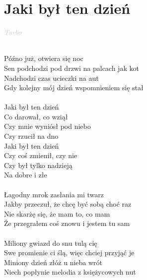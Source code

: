 \documentclass[a5paper, 10pt]{book}
\begin{document}
\section{Jaki był ten dzień}\textcolor{lightgray}{\textit{Turbo}}\\~\\
\begin{minipage}[t]{0.7\textwidth}
Późno już, otwiera się noc\\
Sen podchodzi pod drzwi na palcach jak kot\\
Nadchodzi czas ucieczki na aut\\
Gdy kolejny mój dzień wspomnieniem się stał\\
\\
\hspace*{5mm}Jaki był ten dzień\\
\hspace*{5mm}Co darował, co wziął\\
\hspace*{5mm}Czy mnie wyniósł pod niebo\\
\hspace*{5mm}Czy rzucił na dno\\
\hspace*{5mm}Jaki był ten dzień\\
\hspace*{5mm}Czy coś zmienił, czy nie\\
\hspace*{5mm}Czy był tylko nadzieją\\
\hspace*{5mm}Na dobre i złe\\
\\
Łagodny mrok zasłania mi twarz\\
Jakby przeczuł, że chcę być sobą choć raz\\
Nie skarżę się, że mam to, co mam\\
Że przegrałem coś znowu i jestem tu sam\\
\\
Miliony gwiazd do snu tulą cię\\
Swe promienie ci ślą, więc chciej przyjąć je\\
Miniony dzień złóż u nieba wrót\\
Niech popłynie melodia z księżycowych nut\\

\end{minipage}
\end{document}
